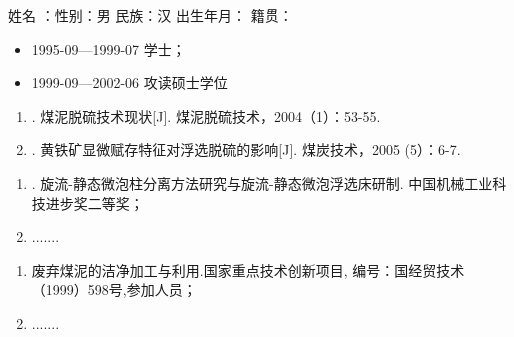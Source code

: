 \begin{resume}

姓名 ：\cumt@author \quad 性别：男 \quad 民族：汉 \quad 出生年月： \quad 籍贯： \par
\begin{itemize}
    \setlength{\itemindent}{5.4em}
    \item[] 1995-09—1999-07  学士；
    \item[] 1999-09—2002-06  攻读硕士学位
\end{itemize}

\begin{enumerate}
    \setlength{\itemindent}{-1.5em}
    \item {}. 煤泥脱硫技术现状[J]. 煤泥脱硫技术，2004（1）：53-55.
    \item {}. 黄铁矿显微赋存特征对浮选脱硫的影响[J]. 煤炭技术，2005 (5）：6-7.
\end{enumerate}

\begin{enumerate}
    \setlength{\itemindent}{-1.5em}
    \item {}. 旋流-静态微泡柱分离方法研究与旋流-静态微泡浮选床研制. 中国机械工业科技进步奖二等奖；
    \item .......
\end{enumerate}

\begin{enumerate}
    \setlength{\itemindent}{-1.5em}
    \item 废弃煤泥的洁净加工与利用.国家重点技术创新项目, 编号：国经贸技术（1999）598号,参加人员；
    \item .......
\end{enumerate}

\end{resume}
